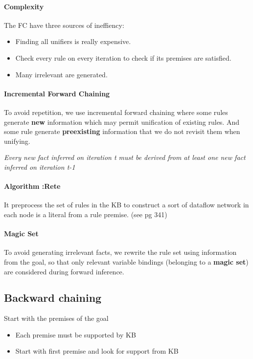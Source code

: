 \paragraph{Complexity}

The FC have three sources of ineffiency:
	\begin{itemize}
		\item Finding all unifiers is really expensive.
		\item Check every rule on every iteration to check if its premises are satisfied.
		\item Many irrelevant are generated.
	\end{itemize} 

\paragraph{Incremental Forward Chaining}
To  avoid repetition,  we use  incremental forward  chaining where  some
rules generate \textbf{new} information which may permit unification of existing
rules. 
And some rule generate \textbf{preexisting} information that we do not revisit
them when unifying.


\textit{Every new fact inferred on iteration t must be derived from at least one
new fact inferred on iteration t-1}

\paragraph{Algorithm :Rete} It preprocess the set  of rules in the KB to
construct a sort  of dataflow network in  each node is a  literal from a
rule premise. (see pg 341)

\paragraph{Magic Set}  To avoid generating irrelevant  facts, we rewrite
the rule  set using  information from  the goal,  so that  only relevant
variable  bindings (belonging  to  a \textbf{magic  set})  are considered  during
forward inference.


\subsection{Backward chaining}

Start with the premises of the goal
	\begin{itemize}
		\item Each premise must be supported by KB
		\item Start with first premise and look for support from KB 
	\end{itemize}


